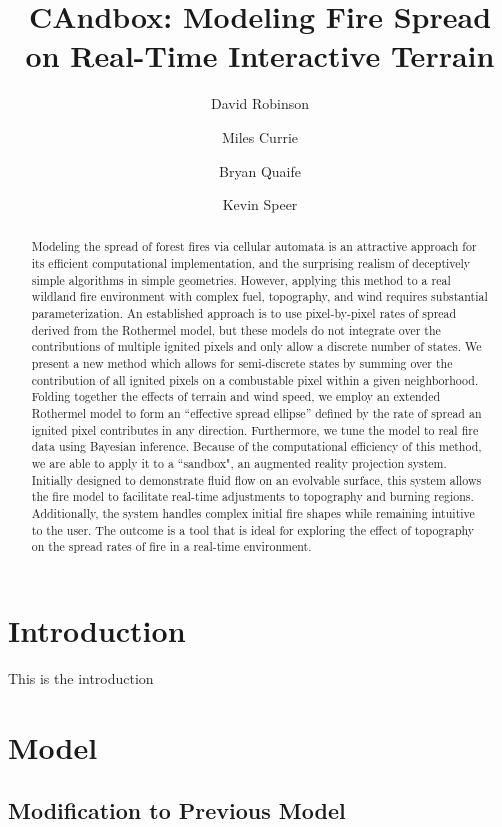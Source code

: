 \documentclass{article}
\author[1, 2]{David Robinson}
\author[1, 2]{Miles Currie}
\author[1, 2]{Bryan Quaife}
\author[1]{Kevin Speer}
\affil[1]{Geophysical Fluid Dynamics Institute}
\affil[2]{FSU Department of Scientific Computing}
\title{CAndbox: Modeling Fire Spread on Real-Time Interactive Terrain}
\date{}
\begin{document}
\maketitle

\begin{abstract}
Modeling the spread of forest fires via cellular automata is an attractive approach for its efficient computational implementation, and the surprising realism of deceptively simple algorithms in simple geometries. However, applying this method to a real wildland fire environment with complex fuel, topography, and wind requires substantial parameterization. An established approach is to use pixel-by-pixel rates of spread derived from the Rothermel model, but these models do not integrate over the contributions of multiple ignited pixels and only allow a discrete number of states. We present a new method which allows for semi-discrete states by summing over the contribution of all ignited pixels on a combustable pixel within a given neighborhood. Folding together the effects of terrain and wind speed, we employ an extended Rothermel model to form an ``effective spread ellipse'' defined by the rate of spread an ignited pixel contributes in any direction. Furthermore, we tune the model to real fire data using Bayesian inference. Because of the computational efficiency of this method, we are able to apply it to a “sandbox", an augmented reality projection system. Initially designed to demonstrate fluid flow on an evolvable surface, this system allows the fire model to facilitate real-time adjustments to topography and burning regions. Additionally, the system handles complex initial fire shapes while remaining intuitive to the user. The outcome is a tool that is ideal for exploring the effect of topography on the spread rates of fire in a real-time environment.

\end{abstract}


\section{Introduction}
This is the introduction

\section{Model}

\subsection{Modification to Previous Model}
\end{document}
